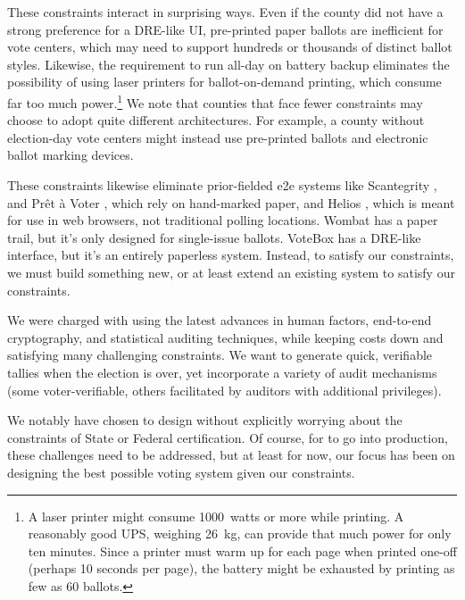 These constraints interact in surprising ways. 
Even if the county did not have a strong preference for a DRE-like UI, 
pre-printed paper
ballots are inefficient for vote centers, which may
need to support hundreds or thousands of distinct ballot
styles. Likewise, the requirement to run all-day on battery backup
eliminates the possibility of using laser printers for
ballot-on-demand printing, which consume far too
much power.\footnote{%
   A laser printer might consume 1000~watts or more
  while printing. A reasonably good UPS, weighing 26~kg, can provide
  that much power for only ten minutes. Since a printer must 
  warm up for each page when printed one-off (perhaps 10
  seconds per page), the battery might be exhausted by printing
  as few as 60 ballots. }
We note that counties that face fewer constraints may choose to adopt
quite different architectures. For example, a county without
election-day vote centers might instead use pre-printed ballots and
electronic ballot marking devices.

These constraints likewise eliminate prior-fielded e2e systems like
Scantegrity \cite{scantegrityTakomaPark,scantegrity}, 
and Pr\^{e}t \`{a} Voter
\cite{pret-a-voter-threats06,pret-a-voter-victoria}, which rely on
hand-marked paper, and
Helios \cite{adida09helios,adida08helios}, which is meant for use in
web browsers, not traditional polling locations. 
Wombat \cite{wombat2012} has a paper trail, but it's only designed
for single-issue ballots.
VoteBox \cite{sandler08votebox} has a DRE-like interface, but it's an entirely paperless system.
Instead, to satisfy our constraints, we must build something new,
or at least extend an existing system to satisfy our constraints.

We were charged with using the latest advances in human factors,
end-to-end cryptography, and statistical auditing techniques, while
keeping costs down and satisfying many challenging constraints.
We want to generate quick, verifiable tallies when the election is
over, yet incorporate a variety of audit mechanisms (some
voter-verifiable, others facilitated by auditors with additional
privileges). 

We notably have chosen to design \projname without explicitly worrying
about the constraints of State or Federal certification.
Of course, for \projname to go into production, these
challenges need to be addressed, but at least for now, our focus
has been on designing the best possible voting system given our
constraints.

